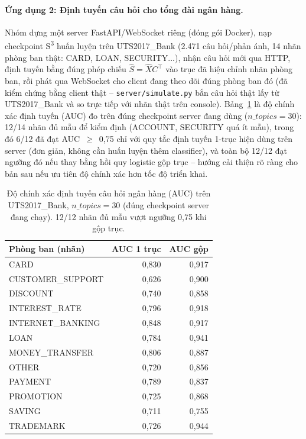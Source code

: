 \documentclass[11pt]{article}
\begin{document}
\paragraph{Ứng dụng 2: Định tuyến câu hỏi cho tổng đài ngân hàng.} Nhóm
dựng một server FastAPI/WebSocket riêng (đóng gói Docker), nạp checkpoint
S\textsuperscript{3} huấn luyện trên UTS2017\_Bank (2.471 câu hỏi/phản ánh,
14 nhãn phòng ban thật: CARD, LOAN, SECURITY...), nhận câu hỏi mới qua
HTTP, định tuyến bằng đúng phép chiếu $\hat{S}=\hat{X}C^{\top}$ vào trục đã
hiệu chỉnh nhãn phòng ban, rồi phát qua WebSocket cho client đang theo dõi
đúng phòng ban đó (đã kiểm chứng bằng client thật -- \texttt{server/simulate.py}
bắn câu hỏi thật lấy từ UTS2017\_Bank và so trực tiếp với nhãn thật trên
console). Bảng~\ref{tab:bank-routing} là độ chính xác định tuyến (AUC) đo
trên đúng checkpoint server đang dùng ($n\_topics=30$): 12/14 nhãn đủ mẫu
để kiểm định (ACCOUNT, SECURITY quá ít mẫu), trong đó 6/12 đã đạt
AUC~$\geq$~0,75 chỉ với quy tắc định tuyến 1-trục hiện dùng trên server
(đơn giản, không cần huấn luyện thêm classifier), và toàn bộ 12/12 đạt
ngưỡng đó nếu thay bằng hồi quy logistic gộp trục -- hướng cải thiện rõ
ràng cho bản sau nếu ưu tiên độ chính xác hơn tốc độ triển khai.

\begin{table}[t]
    \centering
    \small
    \begin{tabular}{@{}l r r@{}}
        \toprule
        \textbf{Phòng ban (nhãn)} & \textbf{AUC 1 trục} & \textbf{AUC gộp} \\
        \midrule
        CARD             & 0,830 & 0,917 \\
        CUSTOMER\_SUPPORT & 0,626 & 0,900 \\
        DISCOUNT         & 0,740 & 0,858 \\
        INTEREST\_RATE    & 0,796 & 0,918 \\
        INTERNET\_BANKING & 0,848 & 0,917 \\
        LOAN             & 0,784 & 0,941 \\
        MONEY\_TRANSFER   & 0,806 & 0,887 \\
        OTHER            & 0,720 & 0,856 \\
        PAYMENT          & 0,789 & 0,837 \\
        PROMOTION        & 0,725 & 0,868 \\
        SAVING           & 0,711 & 0,755 \\
        TRADEMARK        & 0,726 & 0,944 \\
        \bottomrule
    \end{tabular}
    \caption{Độ chính xác định tuyến câu hỏi ngân hàng (AUC) trên
    UTS2017\_Bank, $n\_topics=30$ (đúng checkpoint server đang chạy). 12/12
    nhãn đủ mẫu vượt ngưỡng 0,75 khi gộp trục.}
    \label{tab:bank-routing}
\end{table}
\end{document}

